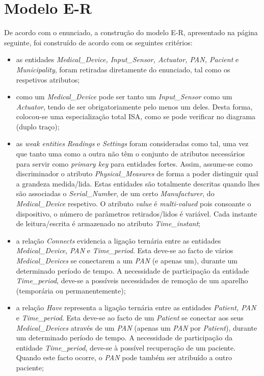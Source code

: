 \documentclass[a4paper]{article}
\begin{document}


\section{Modelo E-R}
De acordo com o enunciado, a construção do modelo E-R, apresentado na página seguinte, foi construído de acordo com os seguintes critérios:
\begin{itemize}

	\item as entidades \textit{Medical\_Device, Input\_Sensor, Actuator, 
	PAN, Pacient} e \textit{Municipality}, foram retiradas diretamente do enunciado, tal como os respetivos atributos;
	
	\item como um \textit{Medical\_Device} pode ser tanto um \textit{Input\_Sensor} 
	como um \textit{Actuator}, tendo de ser obrigatoriamente pelo menos um deles.
	Desta forma, colocou-se uma especialização total ISA, como se pode verificar no diagrama (duplo traço);

	\item as \textit{weak entities} \textit{Readings} e \textit{Settings} foram consideradas como tal, uma vez que tanto uma como a outra não têm o
	conjunto de atributos necessários para servir como \textit{primary key} para entidades fortes. Assim, assume-se como discriminador 
	o atributo \textit{Physical\_Measures} de forma a poder distinguir qual a grandeza medida/lida. Estas entidades são totalmente
	descritas quando lhes são associadas o \textit{Serial\_Number}, de um certo \textit{Manufacturer}, do \textit{Medical\_Device} respetivo. O atributo \textit{value} é
	\textit{multi-valued} pois consoante o dispositivo, o número de parâmetros retirados/lidos é variável. Cada instante de 
	leitura/escrita é 
	armazenado no atributo \textit{Time\_instant};
	
	\item a relação \textit{Connects} evidencia a ligação ternária entre as entidades \textit{Medical}\textit{\_Device},\textit{ PAN} e 
	\textit{Time\_period}. Esta deve-se ao facto de vários \textit{Medical}\textit{\_Devices} se conectarem a um \textit{PAN} (e apenas um),
	 durante um determinado período de tempo. A necessidade de participação da entidade \textit{Time\_period}, deve-se a possíveis
	 necessidades de remoção de um aparelho (temporária ou permanentemente);
	 
	\item a relação \textit{Have} representa a ligação ternária entre as entidades \textit{Patient, PAN} e 
	\textit{Time\_period}. Esta deve-se ao facto de um \textit{Patient} se conectar aos seus \textit{Medical\_Devices}
	através de um \textit{PAN} (apenas um \textit{PAN} por \textit{Patient}),
	 durante um determinado período de tempo. A necessidade de participação da entidade \textit{Time\_period}, deve-se à possível recuperação de
	 um paciente. Quando este facto ocorre, o \textit{PAN} pode também ser atribuído a outro paciente;
	 

\end{itemize}
\end{document}

